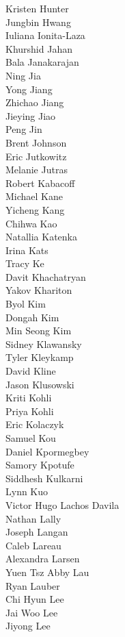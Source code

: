 Kristen Hunter\\
Jungbin Hwang\\
Iuliana Ionita-Laza\\
Khurshid Jahan\\
Bala Janakarajan\\
Ning Jia\\
Yong Jiang\\
Zhichao Jiang\\
Jieying Jiao\\
Peng Jin\\
Brent Johnson\\
Eric Jutkowitz\\
Melanie Jutras\\
Robert Kabacoff\\
Michael Kane\\
Yicheng Kang\\
Chihwa Kao\\
Natallia Katenka\\
Irina Kats\\
Tracy Ke\\
Davit Khachatryan\\
Yakov Khariton\\
Byol Kim\\
Dongah Kim\\
Min Seong Kim\\
Sidney Klawansky\\
Tyler Kleykamp\\
David Kline\\
Jason Klusowski\\
Kriti Kohli\\
Priya Kohli\\
Eric Kolaczyk\\
Samuel Kou\\
Daniel Kpormegbey\\
Samory Kpotufe\\
Siddhesh Kulkarni\\
Lynn Kuo\\
Victor Hugo Lachos Davila\\
Nathan Lally\\
Joseph Langan\\
Caleb Lareau\\
Alexandra Larsen\\
Yuen Tsz Abby Lau\\
Ryan Lauber\\
Chi Hyun Lee\\
Jai Woo Lee\\
Jiyong Lee\\

